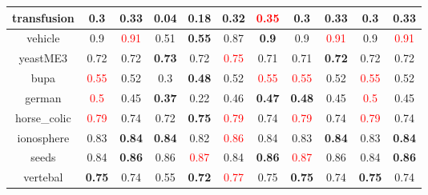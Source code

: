 \documentclass{article}%
\begin{document}
\begin{tabular}{c|cccccccccc}
\hline%
transfusion&0.3&\textbf{0.33}&0.04&\textbf{0.18}&0.32&\textcolor{red}{ 
0.35
}&0.3&\textbf{0.33}&0.3&\textbf{0.33}\\%
\hline%
vehicle&0.9&\textcolor{red}{ 
0.91
}&0.51&\textbf{0.55}&0.87&\textbf{0.9}&0.9&\textcolor{red}{ 
0.91
}&0.9&\textcolor{red}{ 
0.91
}\\%
\hline%
yeastME3&0.72&0.72&\textbf{0.73}&0.72&\textcolor{red}{ 
0.75
}&0.71&0.71&\textbf{0.72}&0.72&0.72\\%
\hline%
bupa&\textcolor{red}{ 
0.55
}&0.52&0.3&\textbf{0.48}&0.52&\textcolor{red}{ 
0.55
}&\textcolor{red}{ 
0.55
}&0.52&\textcolor{red}{ 
0.55
}&0.52\\%
\hline%
german&\textcolor{red}{ 
0.5
}&0.45&\textbf{0.37}&0.22&0.46&\textbf{0.47}&\textbf{0.48}&0.45&\textcolor{red}{ 
0.5
}&0.45\\%
\hline%
horse\_colic&\textcolor{red}{ 
0.79
}&0.74&0.72&\textbf{0.75}&\textcolor{red}{ 
0.79
}&0.74&\textcolor{red}{ 
0.79
}&0.74&\textcolor{red}{ 
0.79
}&0.74\\%
\hline%
ionosphere&0.83&\textbf{0.84}&\textbf{0.84}&0.82&\textcolor{red}{ 
0.86
}&0.84&0.83&\textbf{0.84}&0.83&\textbf{0.84}\\%
\hline%
seeds&0.84&\textbf{0.86}&0.86&\textcolor{red}{ 
0.87
}&0.84&\textbf{0.86}&\textcolor{red}{ 
0.87
}&0.86&0.84&\textbf{0.86}\\%
\hline%
vertebal&\textbf{0.75}&0.74&0.55&\textbf{0.72}&\textcolor{red}{ 
0.77
}&0.75&\textbf{0.75}&0.74&\textbf{0.75}&0.74\\%
\hline%
\end{tabular}

%
\end{document}
